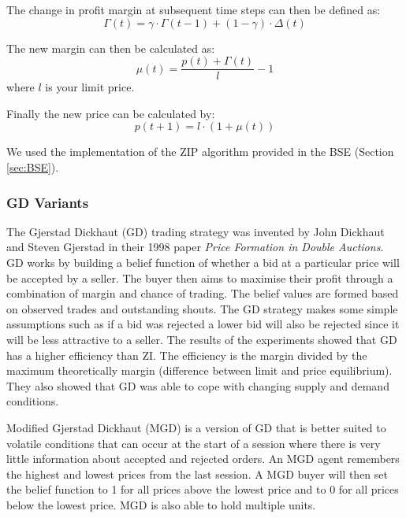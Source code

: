 \documentclass[preprint]{acm_proc_article-sp} %
\begin{document}
The change in profit margin at subsequent time steps can then be defined as:
\begin{equation}
\Gamma(t) = \gamma \cdot \Gamma(t-1) + (1 - \gamma) \cdot \Delta(t)
\end{equation}

The new margin can then be calculated as:
\begin{equation}
\mu(t) = \frac{p(t) + \Gamma(t)}{l} - 1
\end{equation}
where $l$ is your limit price.

Finally the new price can be calculated by:
\begin{equation}
p(t+1) = l \cdot (1 + \mu(t))
\end{equation}

We used the implementation of the ZIP algorithm provided in the BSE (Section \ref{sec:BSE}).\\


\subsubsection{GD Variants} \label{sec:traders_GDV}

The Gjerstad Dickhaut (GD) trading strategy was invented by John Dickhaut and
Steven Gjerstad in their 1998 paper \emph{Price Formation in Double
Auctions}\cite{gd}.
GD works by building a belief function of whether a bid at a particular price
will be accepted by a seller.
The buyer then aims to maximise their profit through a combination of margin
and chance of trading.
The belief values are formed based on observed trades and outstanding shouts.
The GD strategy makes some simple assumptions such as if a bid was rejected a
lower bid will also be rejected since it will be less attractive to a seller.
The results of the experiments showed that GD has a higher efficiency than ZI.
The efficiency is the margin divided by the maximum theoretically margin
(difference between limit and price equilibrium).
They also showed that GD was able to cope with changing supply and demand
conditions.

Modified Gjerstad Dickhaut (MGD)\cite{mgd} is a version of GD that
is better suited to volatile conditions that can occur at the start of a
session where there is very little information about accepted and rejected
orders.
An MGD agent remembers the highest and lowest prices from the last session.
A MGD buyer will then set the belief function to 1 for all prices above the
lowest price and to 0 for all prices below the lowest price.
MGD is also able to hold multiple units.
\end{document}
